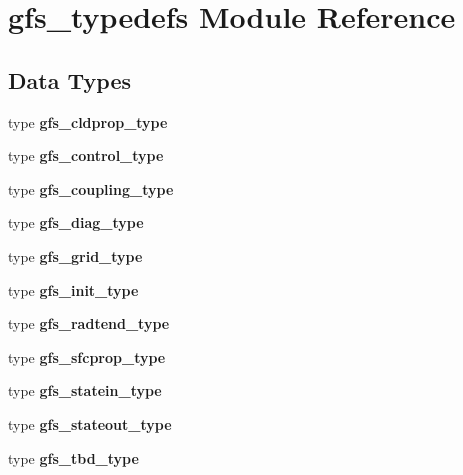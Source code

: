 \section{gfs\+\_\+typedefs Module Reference}
\label{namespacegfs__typedefs}
\subsection*{Data Types}
\begin{DoxyCompactItemize}
\item 
type \textbf{ gfs\+\_\+cldprop\+\_\+type}
\item 
type \textbf{ gfs\+\_\+control\+\_\+type}
\item 
type \textbf{ gfs\+\_\+coupling\+\_\+type}
\item 
type \textbf{ gfs\+\_\+diag\+\_\+type}
\item 
type \textbf{ gfs\+\_\+grid\+\_\+type}
\item 
type \textbf{ gfs\+\_\+init\+\_\+type}
\item 
type \textbf{ gfs\+\_\+radtend\+\_\+type}
\item 
type \textbf{ gfs\+\_\+sfcprop\+\_\+type}
\item 
type \textbf{ gfs\+\_\+statein\+\_\+type}
\item 
type \textbf{ gfs\+\_\+stateout\+\_\+type}
\item 
type \textbf{ gfs\+\_\+tbd\+\_\+type}
\end{DoxyCompactItemize}
